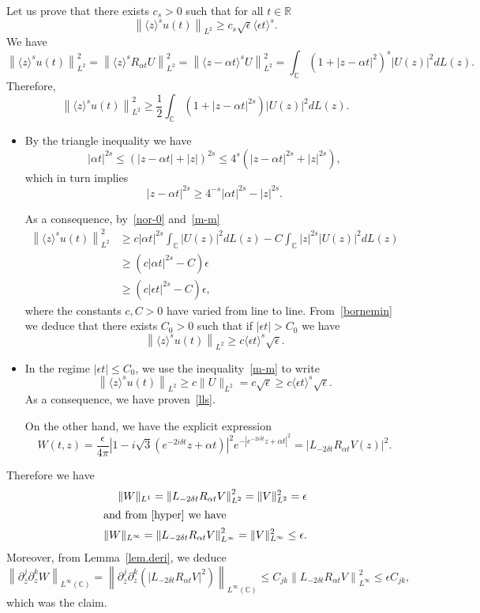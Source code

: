 \documentclass[AHL,Unicode,published]{cedram}
\newcommand{\C}{\mathbb{C}}
\newcommand{\R}{\mathbb{R}}
\newcommand*\eps{\epsilon}
\newcommand{\ov}{\overline}
\newcommand{\<}{\langle}
\renewcommand{\>}{\rangle}
\newcommand{\R}{\mathbb{R}}
\begin{document}
Let us prove that there exists $c_s>0$ such that for all $t \in \R$
\begin{equation}\label{lls}
\left\|\<z\>^s u(t)\right\|_{L^2} \geq c_s \sqrt{\eps} \<\eps t\>^s.
\end{equation}
We have
\[
\left\|\<z\>^s u(t)\right\|^2_{L^2}= \left\|\<z\>^s R_{\alpha t}U\right\|^2_{L^2} = \left\|\<z-\alpha t\>^s U\right\|^2_{L^2}= \int_{\C} \left(1+|z-\alpha t|^2\right)^s |U(z)|^2dL(z).
\]
Therefore,
\begin{equation}\label{m-m}
\left\|\<z\>^s u(t)\right\|^2_{L^2} \geq \frac12 \int_{\C} \left(1+|z-\alpha t|^{2s}\right) |U(z)|^2dL(z).
\end{equation}
\begin{itemize}
\item By the triangle inequality we have
\[
|\alpha t|^{2s} \leq \left(|z- \alpha t|+|z|\right)^{2s} \leq 4^s\left(|z- \alpha t|^{2s}+ |z|^{2s}\right),
\]
which in turn implies
\[
|z- \alpha t|^{2s} \geq 4^{-s}|\alpha t|^{2s} -|z|^{2s}.
\]

As a consequence, by~\eqref{nor-0} and~\eqref{m-m}
\begin{equation}\label{bornemin}
\begin{aligned}
\left\|\<z\>^s u(t)\right\|^2_{L^2} &\geq c |\alpha t|^{2s} \int_{\C} \left|U(z)\right|^2dL(z)- C \int_{\C} |z|^{2s} \left|U(z)\right|^2dL(z) \\
&\geq \left(c |\alpha t|^{2s} - C\right) \eps \\
&\geq \left(c |\eps t|^{2s} - C\right) \eps,
\end{aligned}
\end{equation}
where the constants $c,C>0$ have varied from line to line. From~\eqref{bornemin} we deduce that there exists $C_0>0$ such that if $|\eps t|>C_0$ we have
\[
\left\|\<z\>^s u(t)\right\|_{L^2} \geq c\<\eps t\>^s \sqrt{\eps}.
\]
\item In the regime $|\eps t|\leq C_0$, we use the inequality~\eqref{m-m} to write
\[
\left\|\<z\>^s u(t)\right\|_{L^2} \geq c \| U\|_{L^2}=c \sqrt{\eps} \geq c\<\eps t\>^s \sqrt{\eps}.
\]
As a consequence, we have proven~\eqref{lls}.

On the other hand, we have the explicit expression
\[
W(t,z)=\frac{\eps}{4\pi}\left| 1-i\sqrt{3}\left(e^{-2i\delta t}z+\alpha t\right) \right|^2e^{-\left|e^{-2i\delta t}z+\alpha t\right|^2}= \left|L_{-2\delta t}R_{\alpha t}V(z)\right|^2.
\]
\end{itemize}
Therefore we have
\begin{align*}
\|W\|_{L^1}= \left\| L_{-2\delta t}R_{\alpha t}V\right\|^2_{L^2}= \| V\|^2_{L^2} =\eps
\\
\intertext{and from~\eqref{hyper} we have}
\|W\|_{L^\infty}= \left\| L_{-2\delta t}R_{\alpha t}V\right\|^2_{L^\infty}= \| V\|^2_{L^\infty} \leq \eps.
\end{align*}
Moreover, from Lemma~\ref{lem.deri}, we deduce
\[
\left\|\partial^j_{\ov z } \partial^k_z W \right\|_{L^{\infty}(\C)}= \left\|\partial^j_{\ov z } \partial^k_z \left(\left|L_{-2\delta t}R_{\alpha t}V\right|^2\right) \right\|_{L^{\infty}(\C)} \leq C_{jk} \left\| L_{-2\delta t}R_{\alpha t}V\right\|^2_{L^\infty} \leq \eps C_{jk},
\]
which was the claim.
\end{document}
